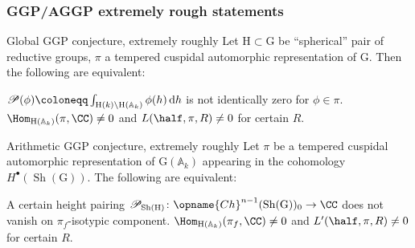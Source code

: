 \documentclass[11pt]{beamer}
\DeclareMathOperator{\Sh}{Sh}
\newcommand{\G}{\mathrm{G}}
\renewcommand{\H}{\mathrm{H}}
\begin{document}
\begin{frame}
  \frametitle{GGP/AGGP extremely rough statements}
  \begin{exampleblock}{Global GGP conjecture, extremely roughly}
    Let $\H \subset \G$ be ``spherical'' pair of reductive groups,
    $\pi$ a tempered cuspidal automorphic representation of $\G$.
    Then the following are equivalent:
    \begin{enumerate}
      \ii $\mathscr P(\phi) \coloneqq \int_{\H(k) \backslash \H(\mathbb A_k)} \phi(h) \odif h$
      is not identically zero for $\phi \in \pi$.
      \ii $\Hom_{\H(\mathbb A_k)}(\pi, \CC) \neq 0$ and $L(\half, \pi , R) \neq 0$
      for certain $R$.
    \end{enumerate}
  \end{exampleblock}
  \begin{exampleblock}{Arithmetic GGP conjecture, extremely roughly}
    Let $\pi$ be a tempered cuspidal automorphic representation of $\G(\mathbb A_k)$
    appearing in the cohomology $H^\bullet(\Sh(\G))$.
    The following are equivalent:
    \begin{enumerate}
      \ii A certain height pairing
      $\mathscr{P}_{\Sh(\H)} \colon \opname{Ch}^{n-1}(\Sh(\G))_0 \to \CC$
      does not vanish on $\pi_f$-isotypic component.
      \ii $\Hom_{\H(\mathbb{A}_k)}(\pi_f, \CC) \neq 0$
      and $L'(\half, \pi, R) \neq 0$ for certain $R$.
    \end{enumerate}
  \end{exampleblock}
\end{frame}
\end{document}
